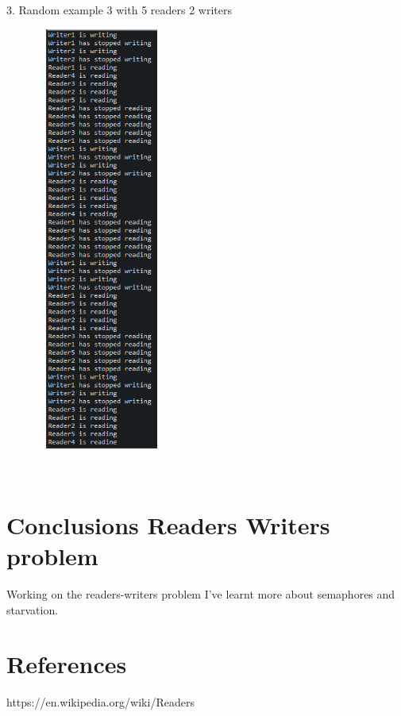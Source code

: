 \documentclass[14pt]{article}
\begin{document}
\begin{center}
3. Random example 3 with 5 readers 2 writers\\
\vspace{10mm}

\includegraphics[height=5.5in, width = 2.5in]{rw3.png}\\
\end{center}\\


\section*{Conclusions Readers Writers problem}
\vspace{10 mm}
Working on the readers-writers problem I've learnt more about semaphores and starvation. 

\newpage
\section*{References}
https://en.wikipedia.org/wiki/Readers%
\end{document}
